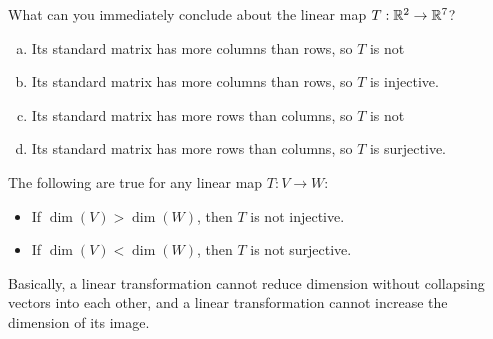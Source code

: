 \begin{applicationActivities}
\begin{activity}{2}
  What can you immediately conclude about the linear map \(T:\mathbb{R}^2\to\mathbb{R}^7\)?
  \begin{enumerate}[a)]
    \item Its standard matrix has more columns than rows, so \(T\) is not
    \item Its standard matrix has more columns than rows, so \(T\) is 
    injective.
    \item Its standard matrix has more rows than columns, so \(T\) is not
    \item Its standard matrix has more rows than columns, so \(T\) is 
    surjective.
  \end{enumerate}
\end{activity}

\begin{fact}
  The following are true for any linear map \(T:V\to W\):
  \begin{itemize}
    \item If \(\dim(V)>\dim(W)\), then \(T\) is not injective.
    \item If \(\dim(V)<\dim(W)\), then \(T\) is not surjective.
  \end{itemize}
  Basically, a linear transformation cannot reduce dimension without collapsing
  vectors into each other, and a linear transformation cannot
  increase the dimension of its image.
  \begin{multicols}{2}


\end{multicols}
\end{fact}
\end{applicationActivities}
